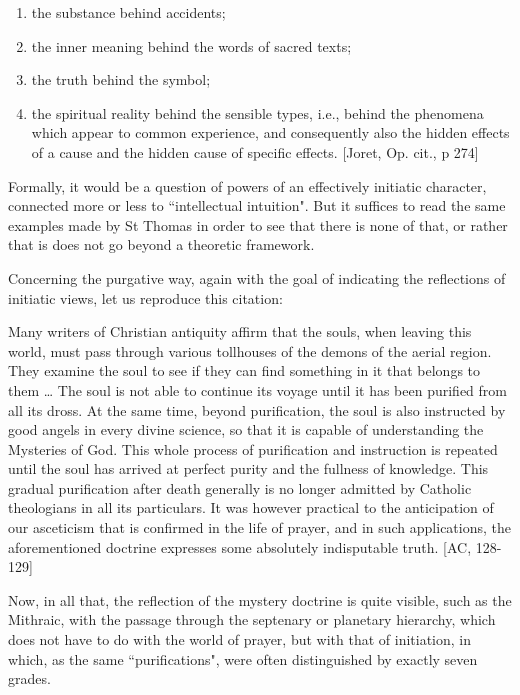 \begin{enumerate}
\item the substance behind accidents; 
\item the inner meaning behind the words of sacred texts; 
\item the truth behind the symbol; 
\item the spiritual reality behind the sensible types, i.e., behind the phenomena which appear to common experience, and consequently also the hidden effects of a cause and the hidden cause of specific effects. [Joret, Op. cit., p 274] 
\end{enumerate}
Formally, it would be a question of powers of an effectively initiatic character, connected more or less to ``intellectual intuition". But it suffices to read the same examples made by St Thomas in order to see that there is none of that, or rather that is does not go beyond a theoretic framework.

Concerning the purgative way, again with the goal of indicating the reflections of initiatic views, let us reproduce this citation:

\begin{quotex}
Many writers of Christian antiquity affirm that the souls, when leaving this world, must pass through various tollhouses of the demons of the aerial region. They examine the soul to see if they can find something in it that belongs to them … The soul is not able to continue its voyage until it has been purified from all its dross. At the same time, beyond purification, the soul is also instructed by good angels in every divine science, so that it is capable of understanding the Mysteries of God. This whole process of purification and instruction is repeated until the soul has arrived at perfect purity and the fullness of knowledge. This gradual purification after death generally is no longer admitted by Catholic theologians in all its particulars. It was however practical to the anticipation of our asceticism that is confirmed in the life of prayer, and in such applications, the aforementioned doctrine expresses some absolutely indisputable truth. [AC, 128-129] 

\end{quotex}
Now, in all that, the reflection of the mystery doctrine is quite visible, such as the Mithraic, with the passage through the septenary or planetary hierarchy, which does not have to do with the world of prayer, but with that of initiation, in which, as the same ``purifications", were often distinguished by exactly seven grades.

